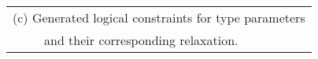 \scriptsize
\begin{tabular}[t]{l}
	(c) Generated logical constraints for type parameters \\
	\ \ \ \ \ and their corresponding relaxation.
\end{tabular}